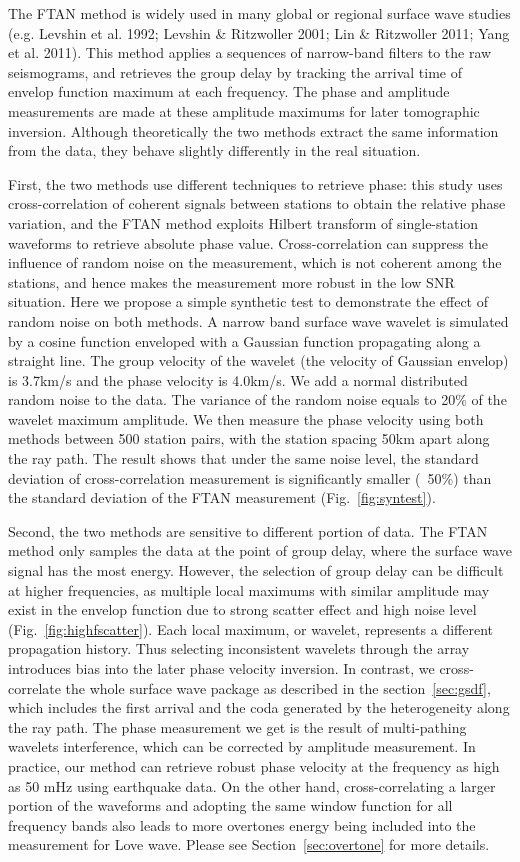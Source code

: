 \documentclass[referee]{gji}
\begin{document}
The FTAN method is widely used in many global or regional surface wave studies (e.g. Levshin et al. 1992; Levshin \& Ritzwoller 2001; Lin \& Ritzwoller 2011; Yang et al. 2011). This method applies a sequences of narrow-band filters to the raw seismograms, and retrieves the group delay by tracking the arrival time of envelop function maximum at each frequency. The phase and amplitude measurements are made at these amplitude maximums for later tomographic inversion. Although theoretically the two methods extract the same information from the data, they behave slightly differently in the real situation.

First, the two methods use different techniques to retrieve phase: this study uses cross-correlation of coherent signals between stations to obtain the relative phase variation, and the FTAN method exploits Hilbert transform of single-station waveforms to retrieve absolute phase value. Cross-correlation can suppress the influence of random noise on the measurement, which is not coherent among the stations, and hence makes the measurement more robust in the low SNR situation. Here we propose a simple synthetic test to demonstrate the effect of random noise on both methods. A narrow band surface wave wavelet is simulated by a cosine function enveloped with a Gaussian function propagating along a straight line. The group velocity of the wavelet (the velocity of Gaussian envelop) is 3.7km/s and the phase velocity is 4.0km/s. We add a normal distributed random noise to the data. The variance of the random noise equals to 20\% of the wavelet maximum amplitude. We then measure the phase velocity using both methods between 500 station pairs, with the station spacing 50km apart along the ray path. The result shows that under the same noise level, the standard deviation of cross-correlation measurement is significantly smaller (~50\%) than the standard deviation of the FTAN measurement (Fig.~\ref{fig:syntest}).

Second, the two methods are sensitive to different portion of data. The FTAN method only samples the data at the point of group delay, where the surface wave signal has the most energy. However, the selection of group delay can be difficult at higher frequencies, as multiple local maximums with similar amplitude may exist in the envelop function due to strong scatter effect and high noise level (Fig.~\ref{fig:highfscatter}). Each local maximum, or wavelet, represents a different propagation history. Thus selecting inconsistent wavelets through the array introduces bias into the later phase velocity inversion. In contrast, we cross-correlate the whole surface wave package as described in the section~\ref{sec:gsdf}, which includes the first arrival and the coda generated by the heterogeneity along the ray path. The phase measurement we get is the result of multi-pathing wavelets interference, which can be corrected by amplitude measurement. In practice, our method can retrieve robust phase velocity at the frequency as high as 50 mHz using earthquake data. On the other hand, cross-correlating a larger portion of the waveforms and adopting the same window function for all frequency bands also leads to more overtones energy being included into the measurement for Love wave. Please see Section~\ref{sec:overtone} for more details.
\end{document}
